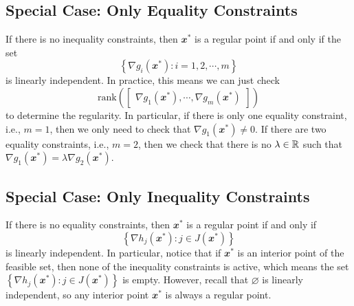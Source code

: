 \documentclass[math, code]{amznotes}
\theoremstyle{remark}
\begin{document}
\subsection{Special Case: Only Equality Constraints}
If there is no inequality constraints, then $\mathbfit{x}^*$ is a regular point if and only if the set 
\begin{equation*}
    \left\{\nabla g_i(\mathbfit{x}^*) \colon i = 1, 2, \cdots, m\right\}
\end{equation*}
is linearly independent. In practice, this means we can just check 
\begin{equation*}
    \mathrm{rank}\left(\begin{bmatrix}
        \nabla g_1(\mathbfit{x}^*), \cdots, \nabla g_m(\mathbfit{x}^*)
    \end{bmatrix}\right)
\end{equation*}
to determine the regularity. In particular, if there is only one equality constraint, i.e., $m = 1$, then we only need to check that $\nabla g_1(\mathbfit{x}^*) \neq \mathbfit{0}$. If there are two equality constraints, i.e., $m = 2$, then we check that there is no $\lambda \in \mathbb{R}$ such that $\nabla g_1(\mathbfit{x}^*) = \lambda \nabla g_2(\mathbfit{x}^*)$.

\subsection{Special Case: Only Inequality Constraints}
If there is no equality constraints, then $\mathbfit{x}^*$ is a regular point if and only if 
\begin{equation*}
    \left\{\nabla h_j(\mathbfit{x}^*) \colon j \in J(\mathbfit{x}^*)\right\}
\end{equation*}
is linearly independent. In particular, notice that if $\mathbfit{x}^*$ is an interior point of the feasible set, then none of the inequality constraints is active, which means the set $\left\{\nabla h_j(\mathbfit{x}^*) \colon j \in J(\mathbfit{x}^*)\right\}$ is empty. However, recall that $\varnothing$ is linearly independent, so any interior point $\mathbfit{x}^*$ is always a regular point.
\end{document}
